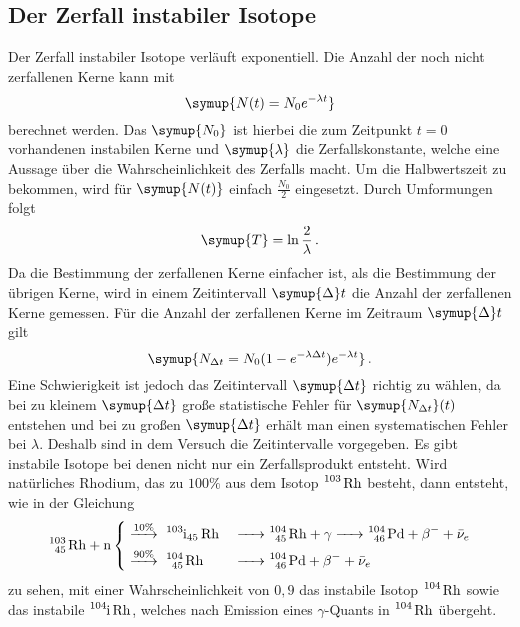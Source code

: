 \subsection{Der Zerfall instabiler Isotope}
Der Zerfall instabiler Isotope verläuft exponentiell. Die Anzahl der noch nicht zerfallenen Kerne kann mit 
\begin{equation}
    \symup{N(t)=N_0 e^{- \lambda t}}
    \label{eqn:isotope}
\end{equation}
berechnet werden. Das $\symup{N_0}$ ist hierbei die zum Zeitpunkt $t=0$ vorhandenen instabilen Kerne und $\symup{\lambda}$ die Zerfallskonstante, welche eine Aussage über die Wahrscheinlichkeit des Zerfalls macht.
Um die Halbwertszeit zu bekommen, wird für $\symup{N(t)}$ einfach $\frac{N_0}{2}$ eingesetzt. Durch Umformungen folgt
\begin{equation}
    \symup{T}=\ln{\frac{2}{\lambda}} \, .
    \label{eqn:halbw}
\end{equation}
Da die Bestimmung der zerfallenen Kerne einfacher ist, als die Bestimmung der übrigen Kerne, wird in einem Zeitintervall $\symup{\Delta}t$
die Anzahl der zerfallenen Kerne gemessen. Für die Anzahl der zerfallenen Kerne im Zeitraum $\symup{\Delta}t$ gilt
\begin{equation}
    \symup{N_{\Delta t}=N_0(1-e^{-\lambda \Delta t})e^{-\lambda t}} \, .
\end{equation}
Eine Schwierigkeit ist jedoch das Zeitintervall $\symup{\Delta t}$ richtig zu wählen, da
bei zu kleinem $\symup{\Delta t}$ große statistische Fehler für $\symup{N_{\Delta t}}(t)$ entstehen 
und bei zu großen $\symup{\Delta t}$ erhält man einen systematischen Fehler bei $\lambda$. 
Deshalb sind in dem Versuch die Zeitintervalle vorgegeben. 
Es gibt instabile Isotope bei denen nicht nur ein Zerfallsprodukt entsteht.
Wird natürliches Rhodium, das zu $100\%$ aus dem Isotop $\ce{^103 Rh}$ besteht, dann entsteht, wie in der Gleichung
\begin{equation}
   \ce{^103_45 Rh + n } 
    \begin{dcases}
        \stackrel{10\%}{\ce{->}}\ce{ ^103i_45 Rh &-> ^104_45 Rh + $\gamma$ -> ^104_46 Pd + $\beta$- + $\bar{\nu}_e$}  \\
        \stackrel{90\%}{\ce{->}}\ce{ ^104_45 Rh  &-> ^104_46 Pd + $\beta$- + $\bar{\nu}_e$} 
    \end{dcases}
\end{equation}
zu sehen, mit einer Wahrscheinlichkeit von $0,9$ das instabile Isotop $\ce{^104 Rh}$ sowie das instabile $\ce{^104i Rh}$, welches nach Emission eines $\gamma$-Quants in $\ce{^104 Rh}$ übergeht.
